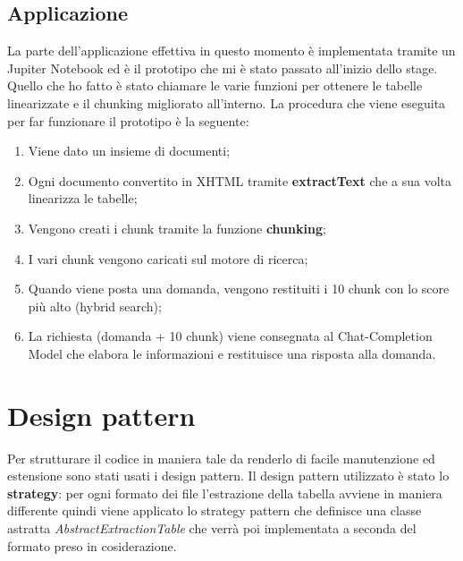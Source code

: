 \subsection{Applicazione}
La parte dell'applicazione effettiva in questo momento è implementata tramite un Jupiter Notebook ed è il prototipo che mi è stato passato all'inizio dello stage.
Quello che ho fatto è stato chiamare le varie funzioni per ottenere le tabelle linearizzate e il chunking migliorato all'interno.
La procedura che viene eseguita per far funzionare il prototipo è la seguente:
\begin{enumerate}
    \item Viene dato un insieme di documenti;
    \item Ogni documento convertito in XHTML tramite \textbf{extractText} che a sua volta linearizza le tabelle;
    \item Vengono creati i chunk tramite la funzione \textbf{chunking};
    \item I vari chunk vengono caricati sul motore di ricerca;
    \item Quando viene posta una domanda, vengono restituiti i 10 chunk con lo score più alto (hybrid search);
    \item La richiesta (domanda + 10 chunk) viene consegnata al Chat-Completion Model che elabora le informazioni e restituisce una risposta alla domanda. 
\end{enumerate}

\section{Design pattern}

Per strutturare il codice in maniera tale da renderlo di facile manutenzione ed estensione sono stati usati i design pattern.
Il design pattern utilizzato è stato lo \textbf{strategy}: per ogni formato dei file l'estrazione della tabella avviene in maniera differente quindi viene applicato lo strategy pattern che definisce una classe astratta \emph{AbstractExtractionTable} che verrà poi implementata a seconda del formato preso in cosiderazione. 
